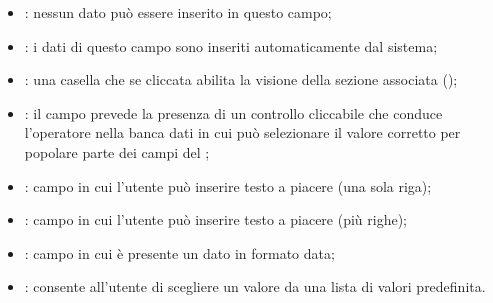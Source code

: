\begin{itemize}
\item{: nessun dato può essere inserito in questo campo;}
\item{: i dati di questo campo sono inseriti automaticamente dal sistema;}
\item{: una casella che se cliccata abilita la visione della sezione associata ();}
\item{: il campo prevede la presenza di un controllo cliccabile che conduce l'operatore nella banca dati in cui può selezionare il valore corretto per popolare parte dei campi del ;}
\item{: campo in cui l'utente può inserire testo a piacere (una sola riga);}
\item{: campo in cui l'utente può inserire testo a piacere (più righe);}
\item{: campo in cui è presente un dato in formato data;}
\item{: consente all'utente di scegliere un valore da una lista di valori predefinita.}
\end{itemize}

